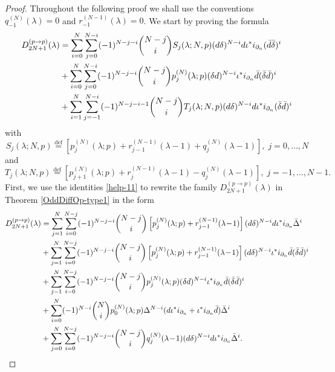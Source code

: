 \documentclass[a4paper,12pt,reqno]{amsart}
\numberwithin{theorem}{subsection}
\numberwithin{equation}{section}
\begin{document}
\begin{proof} Throughout the following proof we shall use the
conventions $q_{-1}^{(N)}(\lambda)=0$ and $r_{-1}^{(N-1)}(\lambda)=0$. We start
by proving the formula
\begin{align}
   D^{(p \to p)}_{2N+1}(\lambda)
   & = \sum_{i=0}^N \sum_{j=0}^{N-i}(-1)^{N-j-i} \binom{N-j}{i} S_j(\lambda;N,p)
   ({d}\delta)^{N-i} {d} \iota^* i_{\partial_n} (\bar{d}\bar{\delta})^i \notag \\
   & + \sum_{i=0}^N \sum_{j=0}^{N-i}(-1)^{N-j-i} \binom{N-j}{i} p_j^{(N)}(\lambda;p)
   (\delta{d})^{N-i} \iota^* i_{\partial_n} \bar{d}(\bar{\delta}\bar{d})^i \notag \\
   & + \sum_{i=1}^N \sum_{j=-1}^{N-i}(-1)^{N-j-i-1} \binom{N-j}{i} T_j(\lambda;N,p)
   ({d}\delta)^{N-i} {d} \iota^* i_{\partial_n} (\bar{\delta}\bar{d})^i \label{odd-2}
\end{align}
with
$$
   S_j(\lambda;N,p) {\stackrel{\text{def}}{=}} \left[p_j^{(N)}(\lambda;p) + r_{j-1}^{(N-1)}(\lambda\!-\!1) +
   q_j^{(N)}(\lambda\!-\!1)\right], \; j=0,\dots,N
$$
and
$$
   T_j(\lambda;N,p) {\stackrel{\text{def}}{=}}
   \left[p_{j+1}^{(N)}(\lambda;p) + r_{j}^{(N-1)}(\lambda\!-\!1) - q_j^{(N)}(\lambda\!-\!1)\right],
   \; j=-1,\dots,N-1.
$$
First, we use the identities \eqref{help-11} to rewrite the family $D^{(p \to
p)}_{2N+1}(\lambda)$ in Theorem \ref{OddDiffOp-type1} in the form
\begin{align}\label{help-13}
   D^{(p \to p)}_{2N+1}(\lambda) & =
   \sum_{j=1}^N\sum_{i=0}^{N-j}(-1)^{N-j-i} \binom{N-j}{i}
   \left[p_j^{(N)}(\lambda;p)+r_{j-1}^{(N-1)}(\lambda\!-\!1)\right]
   ({d}\delta)^{N-i} {d} \iota^* i_{\partial_n} \bar{\Delta}^i \notag\\
   & + \sum_{j=1}^N \sum_{i=0}^{N-j}(-1)^{N-j-i} \binom{N-j}{i}
   \left[p_j^{(N)}(\lambda;p)+r_{j-1}^{(N-1)}(\lambda\!-\!1)\right]
   ({d}\delta)^{N-i} \iota^* i_{\partial_n} \bar{d}(\bar{\delta}\bar{d})^i \notag \\
   & + \sum_{j=1}^N\sum_{i=0}^{N-j}(-1)^{N-j-i} \binom{N-j}{i} p_j^{(N)}(\lambda;p)
   (\delta{d})^{N-i} \iota^* i_{\partial_n} \bar{d}(\bar{\delta}\bar{d})^i \notag \\
   & + \sum_{i=0}^{N}(-1)^{N-i} \binom{N}{i} p_0^{(N)}(\lambda;p)
   \Delta^{N-i}({d} \iota^* i_{\partial_n} + \iota^* i_{\partial_n} \bar{d}) \bar{\Delta}^i \notag\\
   & + \sum_{j=0}^N \sum_{i=0}^{N-j}(-1)^{N-j-i} \binom{N-j}{i} q_j^{(N)}(\lambda\!-\!1)
   ({d}\delta)^{N-i} {d} \iota^* i_{\partial_n} \bar{\Delta}^i.
\end{align}

\end{proof}
\end{document}
